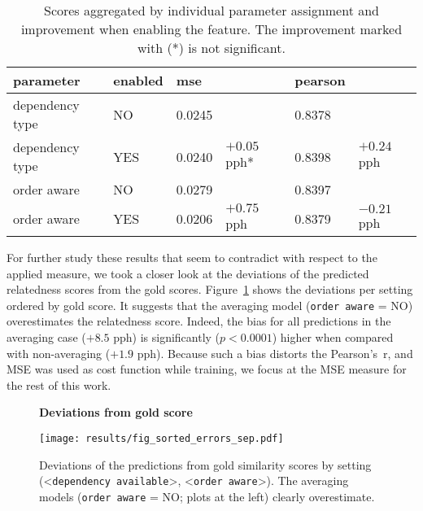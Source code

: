 \begin{table}[htb!]
	\centering
	\begin{tabularx}{\textwidth}{|p{} p{}|p{} X|p{} X|} 
		\hline
		parameter & enabled & mse & & pearson  & \\ \hline \hline
		dependency type & NO & 0.0245 & & 0.8378 & \\
		dependency type & YES & 0.0240 & $+0.05$ pph* & 0.8398 & $+0.24$ pph \\ \hline
		order aware & NO & 0.0279 &  & 0.8397 &  \\
		order aware & YES & 0.0206 & $+0.75$ pph & 0.8379 & $-0.21$ pph \\ \hline	   		
	\end{tabularx}
	\caption{Scores aggregated by individual parameter assignment and improvement when enabling the feature. The improvement marked with (*) is not significant.}
	\label{tab:results_merged}
\end{table}

For further study these results that seem to contradict with respect to the applied measure, we took a closer look at the deviations of the predicted relatedness scores from the gold scores. Figure~\ref{fig:fig_sorted_errors_sep} shows the deviations per setting ordered by gold score. It suggests that the averaging model (\texttt{order aware} = NO) overestimates the relatedness score. Indeed, the bias for all predictions in the averaging case ($+8.5$ pph) is significantly ($p < 0.0001$) higher when compared with non-averaging ($+1.9$ pph). Because such a bias distorts the Pearson's~r, and \ac{MSE} was used as cost function while training, we focus at the \ac{MSE} measure for the rest of this work.

\begin{figure}[htb!]
	\centering
	\textbf{Deviations from gold score}\par\medskip
	\texttt{[image: results/fig\_sorted\_errors\_sep.pdf]}
	\caption{Deviations of the predictions from gold similarity scores by setting (<\texttt{dependency available}>, <\texttt{order aware}>). The averaging models (\texttt{order aware} = NO; plots at the left) clearly overestimate.}
	\label{fig:fig_sorted_errors_sep}
\end{figure}

